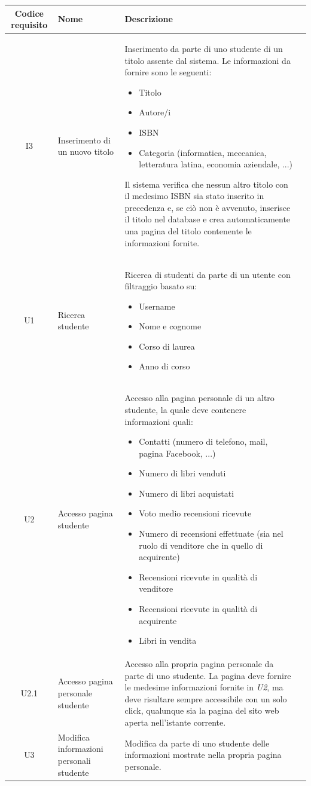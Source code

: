 \documentclass[10pt,a4paper]{report}
\begin{document}
	\begin{tabular}{cp{3cm}p{9cm}p{1cm}}
		Codice requisito&Nome&Descrizione\\ \hline
		I3&Inserimento di un nuovo titolo&Inserimento da parte di uno studente di un titolo assente dal sistema. Le informazioni da fornire sono le seguenti:
		\begin{itemize}
			\item Titolo
			\item Autore/i
			\item ISBN
			\item Categoria (informatica, meccanica, letteratura latina, economia aziendale, ...)
		\end{itemize}
		Il sistema verifica che nessun altro titolo con il medesimo ISBN sia stato inserito in precedenza e, se ciò non è avvenuto, inserisce il titolo nel database e crea automaticamente una pagina del titolo contenente le informazioni fornite.\\ \hline
		U1&Ricerca studente&Ricerca di studenti da parte di un utente con filtraggio basato su:
		\begin{itemize}
			\item Username
			\item Nome e cognome
			\item Corso di laurea
			\item Anno di corso
		\end{itemize}\\ \hline
		U2&Accesso pagina studente&Accesso alla pagina personale di un altro studente, la quale deve contenere informazioni quali:
		\begin{itemize}
			\item Contatti (numero di telefono, mail, pagina Facebook, ...)
			\item Numero di libri venduti
			\item Numero di libri acquistati
			\item Voto medio recensioni ricevute
			\item Numero di recensioni effettuate (sia nel ruolo di venditore che in quello di acquirente)
			\item Recensioni ricevute in qualità di venditore
			\item Recensioni ricevute in qualità di acquirente
			\item Libri in vendita
		\end{itemize}\\ \hline
		U2.1&Accesso pagina personale studente&Accesso alla propria pagina personale da parte di uno studente. La pagina deve fornire le medesime informazioni fornite in \textit{U2}, ma deve risultare sempre accessibile con un solo click, qualunque sia la pagina del sito web aperta nell'istante corrente.\\ \hline
		U3&Modifica informazioni personali studente&Modifica da parte di uno studente delle informazioni mostrate nella propria pagina personale.\\ \hline
	\end{tabular}
	\newpage
	
\end{document}
